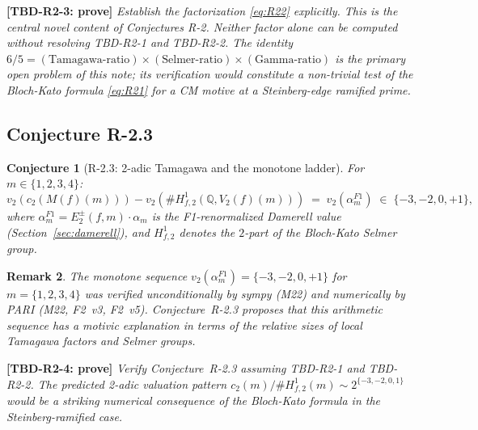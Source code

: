\documentclass[12pt]{amsart}
\newtheorem{conjecture}{Conjecture}[section]
\newtheorem{remark}[conjecture]{Remark}
\theoremstyle{definition}
\newcommand{\Q}{\mathbb{Q}}
\newcommand{\tbdtag}[2]{\textbf{[TBD-R2-#1: prove]} \emph{#2}}
\begin{document}
\tbdtag{3}{Establish the factorization \eqref{eq:R22} explicitly.
This is the \emph{central novel content} of Conjectures R-2.
Neither factor alone can be computed without resolving TBD-R2-1 and TBD-R2-2.
The identity $6/5 = (\text{Tamagawa-ratio}) \times (\text{Selmer-ratio}) \times (\text{Gamma-ratio})$
is the primary open problem of this note; its verification
would constitute a non-trivial test of the Bloch-Kato formula \eqref{eq:R21}
for a CM motive at a Steinberg-edge ramified prime.}

\subsection{Conjecture R-2.3}

\begin{conjecture}[R-2.3: 2-adic Tamagawa and the monotone ladder]
\label{conj:R23}
For $m \in \{1,2,3,4\}$:
\begin{equation}\label{eq:R23}
  v_2(c_2(M(f)(m))) - v_2(\#H^1_{f,2}(\Q, V_2(f)(m)))
  \;=\;
  v_2(\alpha_m^{F1}) \;\in\; \{-3, -2, 0, +1\},
\end{equation}
where $\alpha_m^{F1} = E_2^\pm(f,m) \cdot \alpha_m$ is the
F1-renormalized Damerell value (Section~\ref{sec:damerell}),
and $H^1_{f,2}$ denotes the $2$-part of the Bloch-Kato Selmer group.
\end{conjecture}

\begin{remark}
The monotone sequence $v_2(\alpha_m^{F1}) = \{-3, -2, 0, +1\}$ for
$m = \{1, 2, 3, 4\}$ was verified unconditionally by sympy (M22)
and numerically by PARI (M22, F2~v3, F2~v5). Conjecture~R-2.3
proposes that this arithmetic sequence has a \emph{motivic explanation}
in terms of the relative sizes of local Tamagawa factors and Selmer groups.
\end{remark}

\tbdtag{4}{Verify Conjecture~R-2.3 assuming TBD-R2-1 and TBD-R2-2.
The predicted 2-adic valuation pattern
$c_2(m)/\#H^1_{f,2}(m) \sim 2^{\{-3,-2,0,1\}}$ would be a striking
numerical consequence of the Bloch-Kato formula in the Steinberg-ramified case.}
\end{document}
